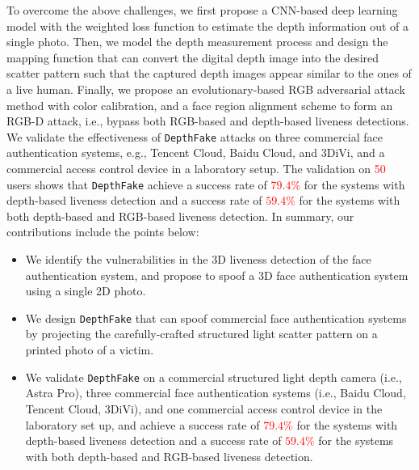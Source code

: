 To overcome the above challenges, we first propose a CNN-based deep learning model with the weighted loss function to estimate the depth information out of a single photo.
Then, we model the depth measurement process and design the mapping function that can convert the digital depth image into the desired scatter pattern such that the captured depth images appear similar to the ones of a live human. 
Finally, we propose an evolutionary-based RGB adversarial attack method with color calibration, and a face region alignment scheme to form an RGB-D attack, i.e., bypass both RGB-based and depth-based liveness detections.
We validate the effectiveness of \texttt{DepthFake} attacks on three commercial face authentication systems, e.g., Tencent Cloud, Baidu Cloud, and 3DiVi, and a commercial access control device in a laboratory setup. The validation on  \textcolor{red}{50} users shows that \texttt{DepthFake} achieve a success rate of  \textcolor{red}{$79.4\%$} for the systems with depth-based liveness detection and a success rate of  \textcolor{red}{$59.4\%$} for the systems with both depth-based and RGB-based liveness detection. In summary, our contributions include the points below:
\begin{itemize}	
	\item We identify the vulnerabilities in the 3D liveness detection of the face authentication system, and propose to spoof a 3D  face authentication system using a single 2D photo.	
	\item We design \texttt{DepthFake} that can spoof commercial face authentication systems by projecting the carefully-crafted structured light scatter pattern on a printed photo of a victim.	
	\item We validate \texttt{DepthFake} on a commercial structured light depth camera (i.e., Astra Pro), three commercial face authentication systems (i.e., Baidu Cloud, Tencent Cloud, 3DiVi), and one commercial access control device in the laboratory set up, and achieve a success rate of  \textcolor{red}{$79.4\%$} for the systems with depth-based liveness detection and a success rate of  \textcolor{red}{$59.4\%$} for the systems with both depth-based and RGB-based liveness detection.
\end{itemize}

